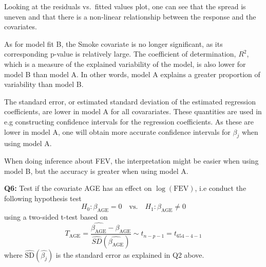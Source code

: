 \documentclass[]{article}
\begin{document}
Looking at the residuals vs.~fitted values plot, one can see that the
spread is uneven and that there is a non-linear relationship between the
response and the covariates.

As for model fit B, the Smoke covariate is no longer significant, as its
corresponding p-value is relatively large. The coefficient of
determination, \(R^2\), which is a measure of the explained variability
of the model, is also lower for model B than model A. In other words,
model A explains a greater proportion of variability than model B.

The standard error, or estimated standard deviation of the estimated
regression coefficients, are lower in model A for all covarariates.
These quantities are used in e.g constructing confidence intervals for
the regression coefficients. As these are lower in model A, one will
obtain more accurate confidence intervals for \(\beta_j\) when using
model A.

When doing inference about FEV, the interpretation might be easier when
using model B, but the accuracy is greater when using model A.

\textbf{Q6:} Test if the covariate AGE has an effect on
\(\log(\text{FEV})\), i.e conduct the following hypothesis test \[
H_0: \beta_{\text{AGE}} = 0 \quad \text{vs.} \quad H_1: \beta_{\text{AGE}} \ne 0
\] using a two-sided t-test based on \[
T_{\text{AGE}} = \frac{\hat{\beta_{\text{AGE}}}-\beta_{\text{AGE}}}{\hat{SD}(\hat{\beta_{\text{AGE}}})} \sim t_{n-p-1} = t_{654-4-1}
\] where \(\hat{\text{SD}}(\hat{\beta_j})\) is the standard error as
explained in Q2 above.
\end{document}
